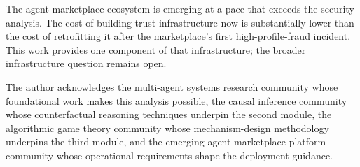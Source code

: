 \documentclass[sigconf,nonacm]{acmart}
\begin{document}
The agent-marketplace ecosystem is emerging at a pace that
exceeds the security analysis. The cost of building trust
infrastructure now is substantially lower than the cost of
retrofitting it after the marketplace's first
high-profile-fraud incident. This work provides one component of
that infrastructure; the broader infrastructure question remains
open.

\begin{acks}
The author acknowledges the multi-agent systems research community
whose foundational work makes this analysis possible, the causal
inference community whose counterfactual reasoning techniques
underpin the second module, the algorithmic game theory community
whose mechanism-design methodology underpins the third module,
and the emerging agent-marketplace platform community whose
operational requirements shape the deployment guidance.
\end{acks}
\end{document}
